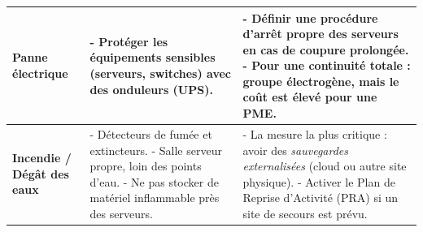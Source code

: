 \documentclass[a4paper,10pt]{article}
\newcommand{\notion}[1]{\textbf{\textcolor{mainBlue}{#1}}}
\newcommand{\important}[1]{\textit{\textcolor{alertRed}{#1}}}
\newcommand{\definition}[1]{\textbf{\textcolor{softTeal}{#1}}}
\begin{document}
\begin{tcolorbox}[title=4) Définir les solutions de continuité]
\begin{tabularx}{\textwidth}{|l|X|X|}
        \notion{Panne électrique} &
        - Protéger les équipements sensibles (serveurs, switches) avec des \definition{onduleurs (UPS)}. &
        - Définir une procédure d'arrêt propre des serveurs en cas de coupure prolongée. \newline
        - Pour une continuité totale : \definition{groupe électrogène}, mais le coût est élevé pour une PME. \\
        \hline

        \notion{Incendie / Dégât des eaux} &
        - Détecteurs de fumée et extincteurs. \newline
        - Salle serveur propre, loin des points d'eau. \newline
        - Ne pas stocker de matériel inflammable près des serveurs. &
        - La mesure la plus critique : avoir des \important{sauvegardes externalisées} (cloud ou autre site physique). \newline
        - Activer le Plan de Reprise d'Activité (PRA) si un site de secours est prévu. \\
        \hline
        
    \end{tabularx}
\end{tcolorbox}
\end{document}
